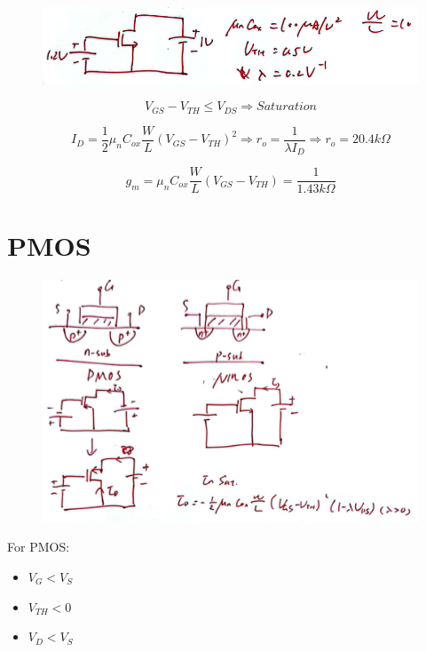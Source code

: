 \documentclass[fontset=windows]{article}
\begin{document}
\begin{figure}[htbp]
    \centering
    \includegraphics[scale=0.6]{7.jpg}
    \captionsetup{labelformat=empty}
    \caption{}
    \label{7}
\end{figure}

$$V_{GS}-V_{TH}\leq V_{DS}\Longrightarrow Saturation$$

$$I_D=\frac{1}{2} \mu_n C_{ox}\frac{W}{L}(V_{GS}-V_{TH})^2\Longrightarrow r_o=\frac{1}{\lambda I_D}\Longrightarrow r_o=20.4k\Omega$$

$$g_m=\mu_n C_{ox}\frac{W}{L}(V_{GS}-V_{TH})=\frac{1}{1.43k\Omega}$$

\section*{PMOS}

\begin{figure}[htbp]
    \centering
    \includegraphics[scale=0.6]{8.jpg}
    \captionsetup{labelformat=empty}
    \caption{}
    \label{8}
\end{figure}

For PMOS: 

\begin{itemize}
    \item $V_G<V_S$
    \item $V_{TH}<0$
    \item $V_D<V_S$
\end{itemize}
\end{document}
